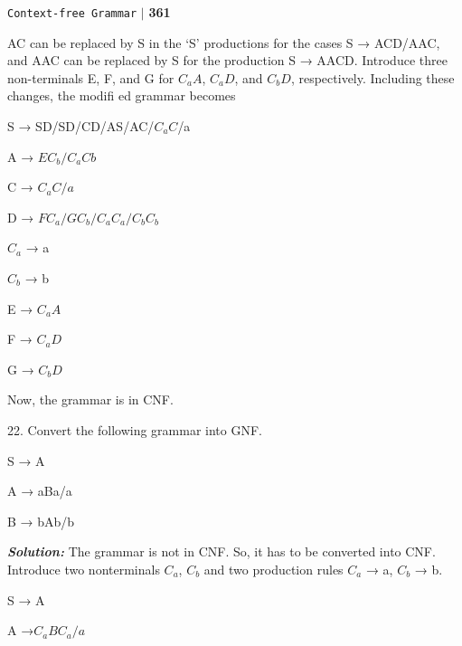 \documentclass{article}
\begin{document}
\begin{flushright}
 \texttt{Context-free Grammar} \hspace*{0.1cm}\textbf{$|$} \hspace*{0.1cm} \textbf{361}\hspace*{0.1cm}
\end{flushright}
\vspace*{0.5cm}

AC can be replaced by S in the ‘S’ productions for the cases S → ACD/AAC, and AAC can be replaced by S for the production S → AACD. Introduce three non-terminals E, F, and G for ${C_aA}$, $C_aD$, and $C_bD$, respectively. Including these changes, the modiﬁ ed grammar becomes
 
\hspace*{5cm} S → SD/SD/CD/AS/AC/$C_aC$/a

\hspace*{5cm} A → $EC_b/C_aCb$ 

\hspace*{5cm} C → $C_aC/a$ 

\hspace*{5cm} D → $FC_a/GC_b/C_aC_a/C_bC_b$ 

\hspace*{5cm} $C_a$ → a 

\hspace*{5cm} $C_b$ → b 

\hspace*{5cm} E → $C_aA$ 

\hspace*{5cm} F → $C_aD$ 

\hspace*{5cm} G → $C_bD$

Now, the grammar is in CNF.

22. Convert the following grammar into GNF.

\hspace*{5cm} S → A 

\hspace*{5cm} A → aBa/a 

\hspace*{5cm} B → bAb/b

\textit{\textbf{Solution:}} The grammar is not in CNF. So, it has to be converted into CNF. Introduce two nonterminals $C_a$, $C_b$ and two production rules $C_a$ → a, $C_b$ → b. 

\hspace*{5cm} S → A 

\hspace*{5cm} A →$ C_aBC_a/a$ 
\end{document}
